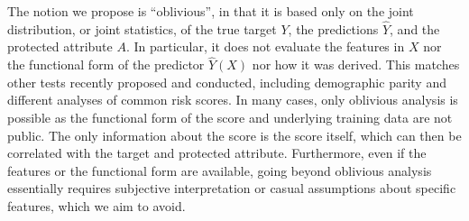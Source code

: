 The notion we propose is ``oblivious'', in that it is based only on
the joint distribution, or joint statistics, of the true target $Y$,
the predictions $\hat{Y}$, and the protected attribute $A$.  In
particular, it does not evaluate the features in $X$ nor the
functional form of the predictor $\hat{Y}(X)$ nor how it was derived.
This matches other tests recently proposed and conducted, including
demographic parity and different analyses of common risk scores. In
many cases, only oblivious analysis is possible as the functional form
of the score and underlying training data are not public. The only
information about the score is the score itself, which can then be
correlated with the target and protected attribute.  Furthermore, even
if the features or the functional form are available, going beyond
oblivious analysis essentially requires subjective interpretation or
casual assumptions about specific features, which we aim to avoid.

